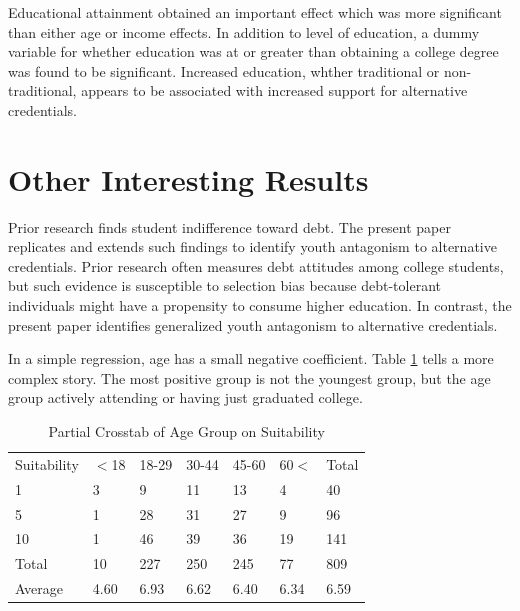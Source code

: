 \documentclass[AER]{./aea-latex-templates/AEA}
\begin{document}
        Educational attainment obtained an important effect which was more
        significant than either age or income effects. In addition to level of
        education, a dummy variable for whether education was at or greater than
        obtaining a college degree was found to be significant. Increased
        education, whther traditional or non-traditional, appears to be
        associated with increased support for alternative credentials.
        
        \section{Other Interesting Results}
        
        Prior research finds student indifference toward debt\cite{davies1995student}.
        The present paper replicates and extends such
        findings to identify youth antagonism to alternative credentials. Prior
        research often measures debt attitudes among college students, but such
        evidence is susceptible to selection bias because debt-tolerant
        individuals might have a propensity to consume higher education. In
        contrast, the present paper identifies generalized youth antagonism to
        alternative credentials.
        
        In a simple regression, age has a small negative coefficient.
        Table \ref{tab:partial_crosstab_voi_agegroup} tells a more complex story.
        The most positive group is not the youngest group, but the age group actively
        attending or having just graduated college.
        
        \begin{table}
            \caption{Partial Crosstab of Age Group on Suitability}
            \begin{tabular}{lllllll}
                Suitability & $<$18 & 18-29 & 30-44 & 45-60 & 60$<$ & Total \\
                1 & 3 & 9 & 11 & 13 & 4 & 40 \\
                5 & 1 & 28 & 31 & 27 & 9 & 96 \\
                10 & 1 & 46 & 39 & 36 & 19 & 141 \\
                Total & 10 & 227 & 250 & 245 & 77 & 809 \\
                Average & 4.60 & 6.93 & 6.62 & 6.40 & 6.34 & 6.59 %
            \end{tabular}
            \label{tab:partial_crosstab_voi_agegroup}
            \end{table}
        
\end{document}
